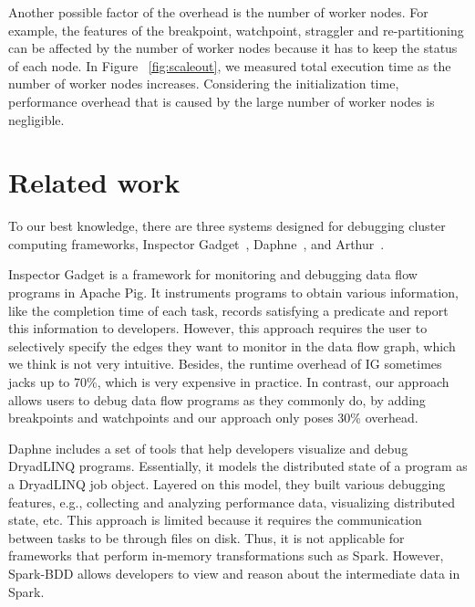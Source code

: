 \documentclass{acm_proc_article-sp}
\begin{document}
Another possible factor of the overhead is the number of worker nodes. For example, the features of the breakpoint, watchpoint, straggler and re-partitioning can be affected by the number of worker nodes because it has to keep the status of each node. In Figure ~\ref{fig:scaleout}, we measured total execution time as the number of worker nodes increases. Considering the initialization time, performance overhead that is caused by the large number of worker nodes is negligible.

\section{Related work}
To our best knowledge, there are three systems designed for debugging cluster computing frameworks, Inspector Gadget~\cite{olston2011inspector}, Daphne~\cite{jagannath2011monitoring}, and Arthur~\cite{dave2013arthur}. 

Inspector Gadget is a framework for monitoring and debugging data flow programs in Apache Pig. It instruments programs to obtain various information, like the completion time of each task, records satisfying a predicate and report this information to developers. However, this approach requires the user to selectively specify the edges they want to monitor in the data flow graph, which we think is not very intuitive. Besides, the runtime overhead of IG sometimes jacks up to 70\%, which is very expensive in practice. In contrast, our approach allows users to debug data flow programs as they commonly do, by adding breakpoints and watchpoints and our approach only poses 30\% overhead. 

Daphne includes a set of tools that help developers visualize and debug DryadLINQ programs. Essentially, it models the distributed state of a program as a DryadLINQ job object. Layered on this model, they built various debugging features, e.g., collecting and analyzing performance data, visualizing distributed state, etc. This approach is limited because it requires the communication between tasks to be through files on disk. Thus, it is not applicable for frameworks that perform in-memory transformations such as Spark. However, Spark-BDD allows developers to view and reason about the intermediate data in Spark. 
\end{document}
